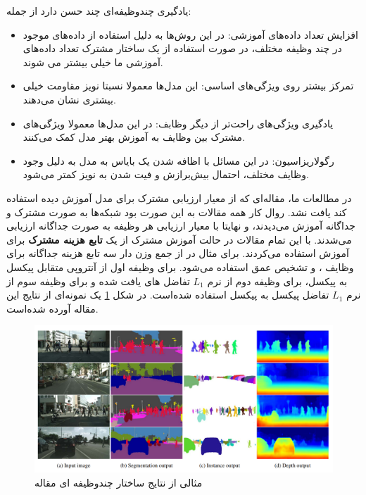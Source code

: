 \documentclass[12pt,a4paper]{report}
\begin{document}
یادگیری چندوظیفه‌ای چند حسن دارد از جمله:
\begin{itemize}
  \item افزایش تعداد داده‌های آموزشی: در این روش‌ها به دلیل استفاده از داده‌های موجود در چند وظیفه مختلف، در صورت استفاده از یک ساختار مشترک تعداد داده‌های آموزشی ما خیلی بیشتر می شوند.
  \item تمرکز بیشتر روی ویژگی‌های اساسی: این مدل‌ها معمولا نسبتا نویز مقاومت خیلی بیشتری نشان می‌دهند.
  \item یادگیری ویژگی‌های راحت‌تر از دیگر وظابف: در این مدل‌ها معمولا ویژگی‌های مشترک بین وظایف به آموزش بهتر مدل کمک می‌کنند.
  \item رگولاریزاسیون: در این مسائل با اظافه شدن یک بایاس به مدل به دلیل وجود وظایف مختلف، احتمال
  بیش‌برازش و فیت شدن به نویز کمتر می‌شود.
\end{itemize}

در مطالعات ما، مقاله‌ای که از معیار ارزیابی مشترک برای مدل آموزش دیده استفاده کند یافت نشد.
روال کار همه مقالات به این صورت بود شبکه‌ها به صورت مشترک و جداگانه آموزش می‌دیدند،
و نهایتا با معیار ارزیابی هر وظیفه به صورت جداگانه ارزیابی می‌شدند.
با این تمام مقالات در حالت آموزش مشترک از یک \textbf{تابع هزینه مشترک} برای آموزش استفاده می‌کردند.
برای مثال در \cite{kendall2018multitask} از جمع وزن دار سه تابع هزینه جداگانه
برای وظایف ،  و تشخیص عمق استفاده می‌شود.
برای وظیفه اول از آنتروپی متقابل پیکسل به پیکسل،
برای وظیفه دوم از نرم $L_1$
تفاضل  های یافت شده و برای وظیفه سوم از
نرم $L_1$ تفاضل پیکسل به پیکسل استفاده شده‌است.
در شکل \ref{joint_res} یک نمونه‌ای از نتایج این مقاله آورده شده‌است.
\begin{figure}
  \centering
  \includegraphics[width=\textwidth]{Images//joint3.png}
  \caption{مثالی از نتایج ساختار چندوظیفه ای مقاله \cite{kendall2018multitask}}\label{joint_res}
\end{figure}
\end{document}
